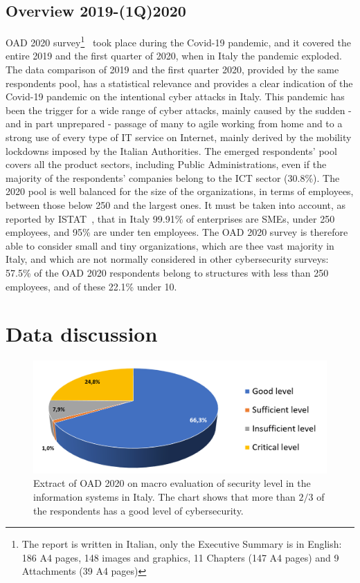 \documentclass{easychair}
\begin{document}
\subsection{Overview 2019-(1Q)2020}

OAD 2020 survey\footnote{The report is written in Italian, only the Executive Summary is in English: 186 A4 pages, 148 images and graphics, 11 Chapters
(147 A4 pages) and 9 Attachments (39 A4 pages)}~\cite{oad20} took place during the Covid-19 pandemic, and it covered the entire 2019 and the first quarter 
of 2020, when in Italy the pandemic exploded. The data comparison of 2019 and the first quarter 2020, provided by the same respondents pool, has a statistical relevance and provides a 
clear indication of the Covid-19 pandemic on the intentional cyber attacks in Italy. This pandemic has been the trigger for a wide range of cyber attacks, mainly 
caused by the sudden - and in part unprepared - passage of many to agile working from home and to a strong use of every type of IT service on Internet, mainly
derived by the mobility lockdowns imposed by the Italian Authorities. The emerged respondents’ pool covers all the product sectors, including Public Administrations,
even if the majority of the respondents’ companies belong to the ICT sector (30.8\%). The 2020 pool is well balanced for the size of the organizations, in terms
of employees, between those below 250 and the largest ones. It must be taken into account, as reported by ISTAT~\cite{istat21}, that in Italy 99.91\%
of enterprises are SMEs, under 250 employees, and 95\% are under ten employees. The OAD 2020 survey is therefore able to consider small and 
tiny organizations, which are thee vast majority in Italy, and which are not normally considered in other cybersecurity surveys: 57.5\% of the OAD 2020 respondents
belong to structures with less than 250 employees, and of these 22.1\% under 10. 

\section{Data discussion}\label{sec:DataDiscussion}

\begin{figure}
	\centering
		\includegraphics[width=1\textwidth]{pictures/fig1.png}
		\caption{Extract of OAD 2020 \cite{oad20} on macro evaluation of security level in the information systems in Italy. The chart shows that more than $ 2/3 $ of the respondents has a good level of cybersecurity.}
		\label{fig:1}
\end{figure}
\end{document}
